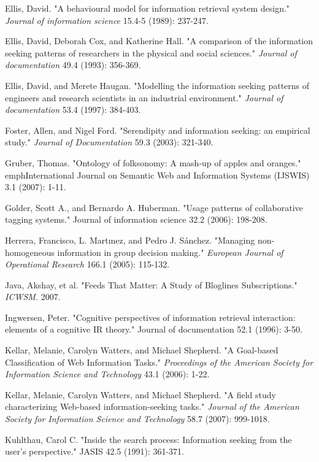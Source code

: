 \documentclass{casconpaper}
\begin{document}
{{\begin{thebibliography}{9}
Ellis, David. "A behavioural model for information retrieval system design." \emph{Journal of information science} 15.4-5 (1989): 237-247.

Ellis, David, Deborah Cox, and Katherine Hall. "A comparison of the information seeking patterns of researchers in the physical and social sciences." \emph{Journal of documentation} 49.4 (1993): 356-369.

Ellis, David, and Merete Haugan. "Modelling the information seeking patterns of engineers and research scientists in an industrial environment." \emph{Journal of documentation} 53.4 (1997): 384-403.

Foster, Allen, and Nigel Ford. "Serendipity and information seeking: an empirical study." \emph{Journal of Documentation} 59.3 (2003): 321-340.

Gruber, Thomas. "Ontology of folksonomy: A mash-up of apples and oranges." emph{International Journal on Semantic Web and Information Systems (IJSWIS)} 3.1 (2007): 1-11.

Golder, Scott A., and Bernardo A. Huberman. "Usage patterns of collaborative tagging systems." Journal of information science 32.2 (2006): 198-208.

Herrera, Francisco, L. Martınez, and Pedro J. Sánchez. "Managing non-homogeneous information in group decision making." \emph{European Journal of Operational Research} 166.1 (2005): 115-132.

Java, Akshay, et al. "Feeds That Matter: A Study of Bloglines Subscriptions." \emph{ ICWSM.} 2007.

Ingwersen, Peter. "Cognitive perspectives of information retrieval interaction: elements of a cognitive IR theory." Journal of documentation 52.1 (1996): 3-50.
   
 Kellar, Melanie, Carolyn Watters, and Michael Shepherd. "A Goal-based Classification of Web Information Tasks." \emph{Proceedings of the American Society for Information Science and Technology} 43.1 (2006): 1-22.

Kellar, Melanie, Carolyn Watters, and Michael Shepherd. "A field study characterizing Web-based information-seeking tasks." \emph{Journal of the American Society for Information Science and Technology} 58.7 (2007): 999-1018.

Kuhlthau, Carol C. "Inside the search process: Information seeking from the user's perspective." JASIS 42.5 (1991): 361-371.


\end{thebibliography}}}
\end{document}
